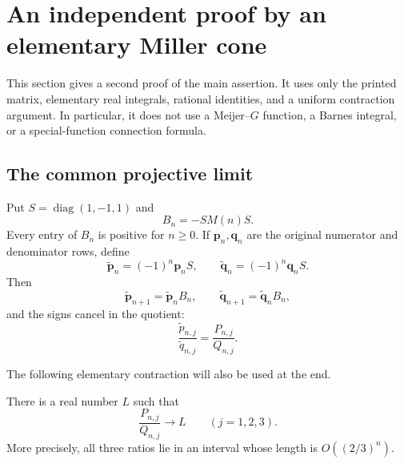 \section{An independent proof by an elementary Miller cone}
\label{sec:miller-independent}

This section gives a second proof of the main assertion.  It uses only
the printed matrix, elementary real integrals, rational identities, and a
uniform contraction argument.  In particular, it does not use a
Meijer--$G$ function, a Barnes integral, or a special-function connection
formula.

\subsection{The common projective limit}

Put $S=\operatorname{diag}(1,-1,1)$ and
\[
        B_n=-SM(n)S.
\]
Every entry of $B_n$ is positive for $n\geq0$.  If
$\boldsymbol p_n,\boldsymbol q_n$ are the original numerator and
denominator rows, define
\[
 \widetilde{\boldsymbol p}_n=(-1)^n\boldsymbol p_nS,\qquad
 \widetilde{\boldsymbol q}_n=(-1)^n\boldsymbol q_nS.
\]
Then
\[
  \widetilde{\boldsymbol p}_{n+1}
       =\widetilde{\boldsymbol p}_nB_n,\qquad
  \widetilde{\boldsymbol q}_{n+1}
       =\widetilde{\boldsymbol q}_nB_n,
\]
and the signs cancel in the quotient:
\[
 \frac{\widetilde p_{n,j}}{\widetilde q_{n,j}}
       =\frac{P_{n,j}}{Q_{n,j}}.
\]

The following elementary contraction will also be used at the end.

\begin{lemma}\label{lem:miller-common-limit}
There is a real number $L$ such that
\[
       \frac{P_{n,j}}{Q_{n,j}}\longrightarrow L
       \qquad(j=1,2,3).
\]
More precisely, all three ratios lie in an interval whose length is
$O((2/3)^n)$.
\end{lemma}

